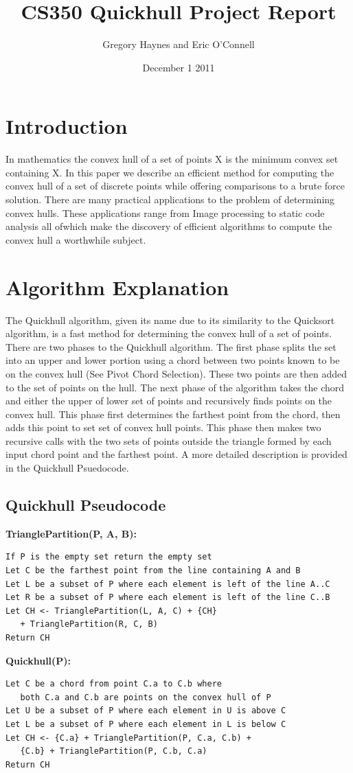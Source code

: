 \documentclass[11pt]{article}
\title{CS350 Quickhull Project Report}
\author{Gregory Haynes and Eric O'Connell}
\date{December 1 2011}
\begin{document}
\maketitle

\section{Introduction}

In mathematics the convex hull of a set of points X is the minimum convex set containing X\cite{Wikipedia:QH}. In this paper we describe an efficient method for computing the convex hull of a set of discrete points while offering comparisons to a brute force solution. There are many practical applications to the problem of determining convex hulls. These applications range from Image processing to static code analysis all ofwhich make the discovery of efficient algorithms to compute the convex hull a worthwhile subject.

\section{Algorithm Explanation}

The Quickhull algorithm, given its name due to its similarity to the Quicksort algorithm, is a fast method for determining the convex hull of a set of points. There are two phases to the Quickhull algorithm. The first phase splits the set into an upper and lower portion using a chord between two points known to be on the convex hull (See Pivot Chord Selection). These two points are then added to the set of points on the hull. The next phase of the algorithm takes the chord and either the upper of lower set of points and recursively finds points on the convex hull. This phase first determines the farthest point from the chord, then adds this point to set set of convex hull points. This phase then makes two recursive calls with the two sets of points outside the triangle formed by each input chord point and the farthest point. A more detailed description is provided in the Quickhull Psuedocode.

\subsection{Quickhull Pseudocode}

\textbf{TrianglePartition(P, A, B):}
\begin{verbatim}
If P is the empty set return the empty set
Let C be the farthest point from the line containing A and B
Let L be a subset of P where each element is left of the line A..C
Let R be a subset of P where each element is left of the line C..B
Let CH <- TrianglePartition(L, A, C) + {CH}
   + TrianglePartition(R, C, B)
Return CH
\end{verbatim}
\textbf{Quickhull(P):}
\begin{verbatim}
Let C be a chord from point C.a to C.b where 
   both C.a and C.b are points on the convex hull of P
Let U be a subset of P where each element in U is above C
Let L be a subset of P where each element in L is below C
Let CH <- {C.a} + TrianglePartition(P, C.a, C.b) + 
   {C.b} + TrianglePartition(P, C.b, C.a)
Return CH
\end{verbatim}
\end{document}
